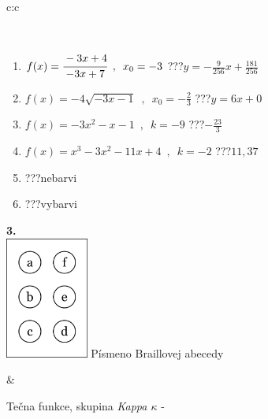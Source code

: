 \documentclass[10pt]{report}
\begin{document}
\begin{tabular}{c:c}
\begin{minipage}[c][104.5mm][t]{0.5\linewidth}
\begin{center}
\begin{minipage}{0.95\linewidth}
\begin{center}
\end{center}
\end{minipage}
\\[1mm]
\begin{minipage}{0.79\linewidth}
\begin{center}
\begin{varwidth}{\linewidth}
\begin{enumerate}
\small
\item $f(x)=\cfrac{-3x+4}{-3x+7}\enspace , \enspace x_0=-3$\quad \dotfill\; ???\;\dotfill \quad $y = -\frac{9}{256}x+\frac{181}{256}$
\item $f(x)=-4\sqrt{-3x-1}\enspace , \enspace x_0=-\frac{2}{3}$\quad \dotfill\; ???\;\dotfill \quad $y = 6x+0$
\item $f(x)=-3x^2-x-1\enspace , \enspace k=-9$\quad \dotfill\; ???\;\dotfill \quad $-\frac{23}{3}$
\item $f(x)=x^3-3x^2-11x+4\enspace , \enspace k=-2$\quad \dotfill\; ???\;\dotfill \quad $11 , 37$
\item \quad \dotfill\; ???\;\dotfill \quad nebarvi
\item \quad \dotfill\; ???\;\dotfill \quad vybarvi
\end{enumerate}
\end{varwidth}
\end{center}
\end{minipage}
\begin{minipage}{0.20\linewidth}
\begin{center}
{\Huge\bfseries 3.} \\[2mm]
\includegraphics[height=40mm]{../images/braille.png}
{\small Písmeno Braillovej abecedy}
\end{center}
\end{minipage}
\end{center}
\end{minipage}
&
\begin{minipage}[c][104.5mm][t]{0.5\linewidth}
\begin{center}
\vspace{7mm}
{\huge Tečna funkce, skupina \textit{Kappa $\kappa$} -}\\[5mm]

\end{center}
\end{minipage}
\end{tabular}
\end{document}
